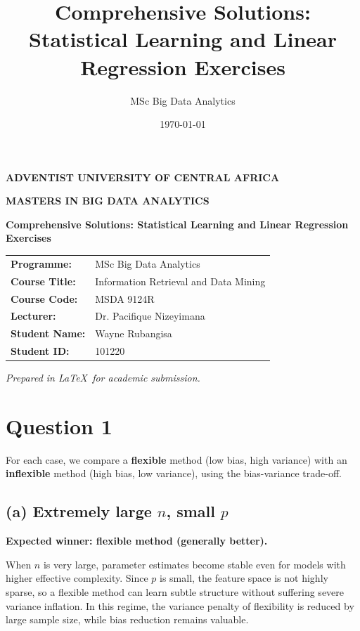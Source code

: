 \documentclass[12pt]{article}
\title{Comprehensive Solutions: Statistical Learning and Linear Regression Exercises}
\author{MSc Big Data Analytics}
\date{\today}
\begin{document}
\begin{titlepage}
\centering
\vspace*{1.5cm}

{\Large \textbf{ADVENTIST UNIVERSITY OF CENTRAL AFRICA}\par}
\vspace{0.4cm}
{\large \textbf{MASTERS IN BIG DATA ANALYTICS}\par}
\vspace{0.4cm}

\vspace{1.8cm}
\vspace{0.5cm}
{\Large \textbf{Comprehensive Solutions: Statistical Learning and Linear Regression Exercises}\par}

\vspace{1.5cm}
\begin{tabular}{>{\bfseries}p{6cm}p{8cm}}
Programme: & MSc Big Data Analytics \\
Course Title: & Information Retrieval and Data Mining \\
Course Code: & MSDA 9124R \\
Lecturer: & Dr. Pacifique Nizeyimana \\
Student Name: & Wayne Rubangisa \\
Student ID: & 101220 \\
\end{tabular}

\vfill
{\normalsize \textit{Prepared in \LaTeX\ for academic submission.}\par}
\vspace{0.8cm}
\end{titlepage}

\section*{Question 1}
For each case, we compare a \textbf{flexible} method (low bias, high variance) with an \textbf{inflexible} method (high bias, low variance), using the bias-variance trade-off.

\subsection*{(a) Extremely large $n$, small $p$}
\textbf{Expected winner: flexible method (generally better).}

When $n$ is very large, parameter estimates become stable even for models with higher effective complexity. Since $p$ is small, the feature space is not highly sparse, so a flexible method can learn subtle structure without suffering severe variance inflation. In this regime, the variance penalty of flexibility is reduced by large sample size, while bias reduction remains valuable.
\end{document}

